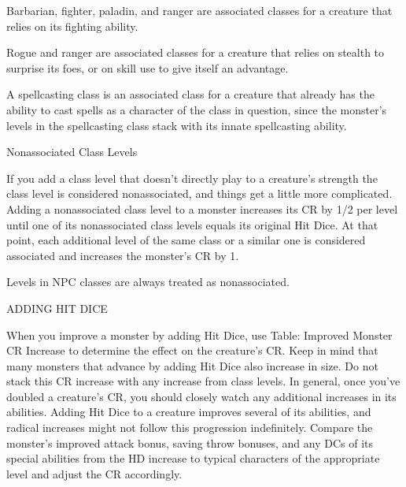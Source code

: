 \documentclass{article}
\begin{document}
Barbarian, fighter, paladin, and ranger are associated classes for a creature that 
relies on its fighting ability.

Rogue and ranger are associated classes for a creature that relies on stealth to 
surprise its foes, or on skill use to give itself an advantage. 

A spellcasting class is an associated class for a creature that already has the 
ability to cast spells as a character of the class in question, since the monster's 
levels in the spellcasting class stack with its innate spellcasting ability.

\vspace{12pt}
Nonassociated Class Levels

If you add a class level that doesn't directly play to a creature's strength the 
class level is considered nonassociated, and things get a little more complicated\textit{. 
}Adding a nonassociated class level to a monster increases its CR by 1/2 per level 
until one of its nonassociated class levels equals its original Hit Dice. At that 
point, each additional level of the same class or a similar one is considered associated 
and increases the monster's CR by 1.

Levels in NPC classes are always treated as nonassociated.

\vspace{12pt}
ADDING HIT DICE

When you improve a monster by adding Hit Dice, use Table: Improved Monster CR Increase 
to determine the effect on the creature's CR. Keep in mind that many monsters that 
advance by adding Hit Dice also increase in size. Do not stack this CR increase 
with any increase from class levels. In general, once you've doubled a creature's 
CR, you should closely watch any additional increases in its abilities. Adding 
Hit Dice to a creature improves several of its abilities, and radical increases 
might not follow this progression indefinitely. Compare the monster's improved 
attack bonus, saving throw bonuses, and any DCs of its special abilities from the 
HD increase to typical characters of the appropriate level and adjust the CR accordingly.
\end{document}
